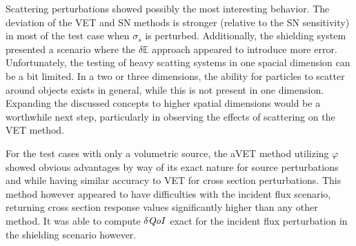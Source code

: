 \documentclass[12pt]{report}
\newcommand{\Edd}{\mathbb{E}}
\newcommand{\sigs}{\sigma_s}
\newcommand{\qoi}{{\it QoI}\xspace}
\begin{document}
Scattering perturbations showed possibly the most interesting behavior. The deviation of the VET and SN methods is stronger (relative to the SN sensitivity) in most of the test case when $\sigs$ is perturbed. Additionally, the shielding system presented a scenario where the $\delta \Edd$ approach appeared to introduce more error. Unfortunately, the testing of heavy scatting systems in one spacial dimension can be a bit limited. In a two or three dimensions, the ability for particles to scatter around objects exists in general, while this is not present in one dimension. Expanding the discussed concepts to higher spatial dimensions would be a worthwhile next step, particularly in observing the effects of scattering on the VET method.

For the test cases with only a volumetric source, the aVET method utilizing $\varphi$ showed obvious advantages by way of its exact nature for source perturbations and while having similar accuracy to VET for cross section perturbations. This method however appeared to have difficulties with the incident flux scenario, returning cross section response values significantly higher than any other method. It was able to compute $\delta \qoi$ exact for the incident flux perturbation in the shielding scenario however.



% 
%

\let\oldbibitem\bibitem
\renewcommand{\bibitem}{\setlength{\itemsep}{0pt}\oldbibitem}


{}

\renewcommand{\bibname}{{\normalsize\rm REFERENCES}}
\end{document}
